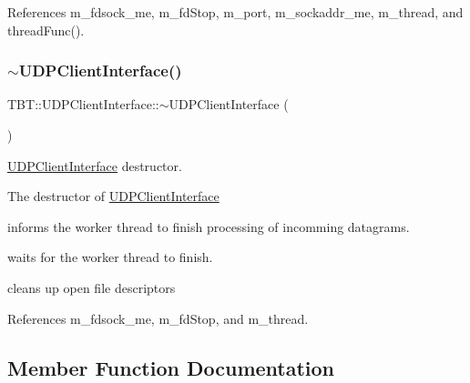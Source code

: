 References m\+\_\+fdsock\+\_\+me, m\+\_\+fd\+Stop, m\+\_\+port, m\+\_\+sockaddr\+\_\+me, m\+\_\+thread, and thread\+Func().

\mbox{\label{classTBT_1_1UDPClientInterface_af3361cf4ee8f6ab5a854f34cd1377f0e_af3361cf4ee8f6ab5a854f34cd1377f0e}} 
\subsubsection{\texorpdfstring{$\sim$\+U\+D\+P\+Client\+Interface()}{~UDPClientInterface()}}
{\footnotesize\ttfamily T\+B\+T\+::\+U\+D\+P\+Client\+Interface\+::$\sim$\+U\+D\+P\+Client\+Interface (\begin{DoxyParamCaption}{ }\end{DoxyParamCaption})\hspace{0.3cm}{\ttfamily [virtual]}}



\hyperlink{classTBT_1_1UDPClientInterface}{U\+D\+P\+Client\+Interface} destructor. 

The destructor of \hyperlink{classTBT_1_1UDPClientInterface}{U\+D\+P\+Client\+Interface}
\begin{DoxyItemize}
\item informs the worker thread to finish processing of incomming datagrams.
\item waits for the worker thread to finish.
\item cleans up open file descriptors 
\end{DoxyItemize}

References m\+\_\+fdsock\+\_\+me, m\+\_\+fd\+Stop, and m\+\_\+thread.



\subsection{Member Function Documentation}
\mbox{\label{classTBT_1_1UDPClientInterface_a33a0c51d141a457cda9dacc4d82d5304_a33a0c51d141a457cda9dacc4d82d5304}} 
